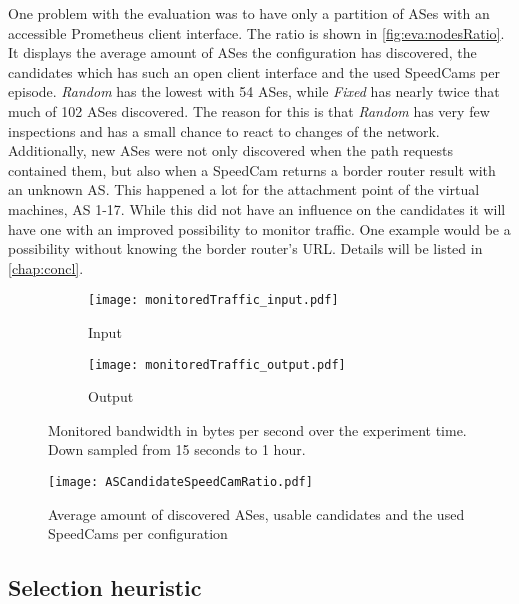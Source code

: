 \documentclass[thesis.tex]{subfiles}
\begin{document}
One problem with the evaluation was to have only a partition of ASes with an accessible Prometheus client interface. The ratio is shown in \autoref{fig:eva:nodesRatio}. It displays the average amount of ASes the configuration has discovered, the candidates which has such an open client interface and the used SpeedCams per episode. \textit{Random} has the lowest with 54 ASes, while \textit{Fixed} has nearly twice that much of 102 ASes discovered. The reason for this is that \textit{Random} has very few inspections and has a small chance to react to changes of the network. Additionally, new ASes were not only discovered when the path requests contained them, but also when a SpeedCam returns a border router result with an unknown AS. This happened a lot for the attachment point of the virtual machines, AS 1-17. While this did not have an influence on the candidates it will have one with an improved possibility to monitor traffic. One example would be a possibility without knowing the border router's URL. Details will be listed in \autoref{chap:concl}.

\begin{figure}[!h]
	\centering
	\begin{subfigure}{.8\linewidth}
		\centering
		\texttt{[image: monitoredTraffic\_input.pdf]}
		\caption{Input}
		\label{fig:eva:monitoredTraffic:input}
	\end{subfigure}
	\hfill
	\begin{subfigure}{.8\linewidth}
		\centering
		\texttt{[image: monitoredTraffic\_output.pdf]}
		\caption{Output}
		\label{fig:eva:monitoredTraffic:output}
	\end{subfigure}
	\caption{Monitored bandwidth in bytes per second over the experiment time. Down sampled from 15 seconds to 1 hour.}
	\label{fig:eva:monitoredTraffic}
\end{figure}

\begin{figure}[h]
	\centering
	\texttt{[image: ASCandidateSpeedCamRatio.pdf]}
	\caption{Average amount of discovered ASes, usable candidates and the used SpeedCams per configuration}
	\label{fig:eva:nodesRatio}
\end{figure}

\subsection{Selection heuristic} \label{sec:eva:selectionHeuristic}
\end{document}
